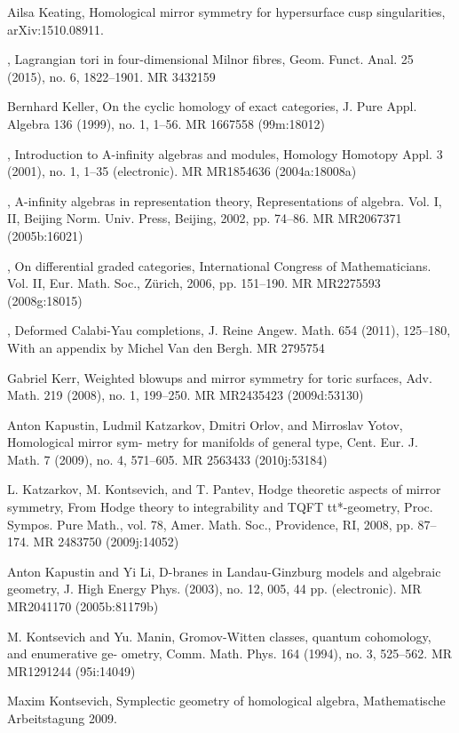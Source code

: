 {\begin{list}{}{%
  \setlength{\leftmargin}{3.4em}%
  \setlength{\itemindent}{-3.4em}%
  \setlength{\itemsep}{1.5pt}%
  \setlength{\parsep}{0pt}%
  \setlength{\listparindent}{0pt}%
}
\item[{[Kea]}] Ailsa Keating, Homological mirror symmetry for hypersurface cusp singularities, arXiv:1510.08911.
\item[{[Kea15]}] , Lagrangian tori in four-dimensional Milnor fibres, Geom. Funct. Anal. 25 (2015), no. 6, 1822--1901. MR 3432159
\item[{[Kel99]}] Bernhard Keller, On the cyclic homology of exact categories, J. Pure Appl. Algebra 136 (1999), no. 1, 1--56. MR 1667558 (99m:18012)
\item[{[Kel01]}] , Introduction to A-infinity algebras and modules, Homology Homotopy Appl. 3 (2001), no. 1, 1--35 (electronic). MR MR1854636 (2004a:18008a)
\item[{[Kel02]}] , A-infinity algebras in representation theory, Representations of algebra. Vol. I, II, Beijing Norm. Univ. Press, Beijing, 2002, pp. 74--86. MR MR2067371 (2005b:16021)
\item[{[Kel06]}] , On differential graded categories, International Congress of Mathematicians. Vol. II, Eur. Math. Soc., Zürich, 2006, pp. 151--190. MR MR2275593 (2008g:18015)
\item[{[Kel11]}] , Deformed Calabi-Yau completions, J. Reine Angew. Math. 654 (2011), 125--180, With an appendix by Michel Van den Bergh. MR 2795754
\item[{[Ker08]}] Gabriel Kerr, Weighted blowups and mirror symmetry for toric surfaces, Adv. Math. 219 (2008), no. 1, 199--250. MR MR2435423 (2009d:53130)
\item[{[KKOY09]}] Anton Kapustin, Ludmil Katzarkov, Dmitri Orlov, and Mirroslav Yotov, Homological mirror sym- metry for manifolds of general type, Cent. Eur. J. Math. 7 (2009), no. 4, 571--605. MR 2563433 (2010j:53184)
\item[{[KKP08]}] L. Katzarkov, M. Kontsevich, and T. Pantev, Hodge theoretic aspects of mirror symmetry, From Hodge theory to integrability and TQFT tt*-geometry, Proc. Sympos. Pure Math., vol. 78, Amer. Math. Soc., Providence, RI, 2008, pp. 87--174. MR 2483750 (2009j:14052)
\item[{[KL03]}] Anton Kapustin and Yi Li, D-branes in Landau-Ginzburg models and algebraic geometry, J. High Energy Phys. (2003), no. 12, 005, 44 pp. (electronic). MR MR2041170 (2005b:81179b)
\item[{[KM94]}] M. Kontsevich and Yu. Manin, Gromov-Witten classes, quantum cohomology, and enumerative ge- ometry, Comm. Math. Phys. 164 (1994), no. 3, 525--562. MR MR1291244 (95i:14049)
\item[{[Kon]}] Maxim Kontsevich, Symplectic geometry of homological algebra, Mathematische Arbeitstagung 2009.

\end{list}}
